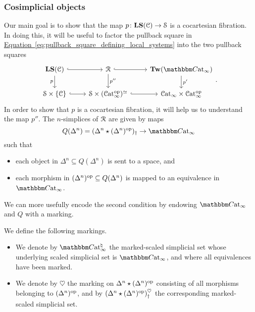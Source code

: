 \documentclass[main.tex]{subfiles}
\begin{document}
\subsubsection{Cosimplicial objects}
\label{sss:cosimplicial_objects}

Our main goal is to show that the map $p\colon \mathbf{LS}(\mathcal{C}) \to \mathcal{S}$ is a cocartesian fibration. In doing this, it will be useful to factor the pullback square in \hyperref[eq:pullback_square_defining_local_systems]{Equation~\ref*{eq:pullback_square_defining_local_systems}} into the two pullback squares
\begin{equation*}
  \begin{tikzcd}
    \LS(\category{C})
    \arrow[r, hook]
    \arrow[d, swap, "p"]
    & \mathcal{R}
    \arrow[r, hook]
    \arrow[d, "p''"]
    & \Tw(\ICCat)
    \arrow[d, "p'"]
    \\
    \S \times \{\category{C}\}
    \arrow[r, hook]
    & \S \times (\ICat\op)^{\simeq}
    \arrow[r, hook]
    & \ICat \times \ICat\op
  \end{tikzcd}.
\end{equation*}
In order to show that $p$ is a cocartesian fibration, it will help us to understand the map $p''$. The $n$-simplices of $\mathcal{R}$ are given by maps
\begin{equation*}
  Q(\Delta^{n}) = (\Delta^{n} \star (\Delta^{n})\op)_{\dagger} \to \ICCat
\end{equation*}
such that
\begin{itemize}
  \item each object in $\Delta^{n}\subseteq Q(\Delta^{n})$ is sent to a space, and

  \item each morphism in $(\Delta^{n})^{\mathrm{op}} \subseteq Q(\Delta^{n})$ is mapped to an equivalence in $\ICCat$.
\end{itemize}
We can more usefully encode the second condition by endowing $\ICCat$ and $Q$ with a marking.

\begin{definition}
  We define the following markings.
  \begin{itemize}
    \item We denote by $\ICCat^{\natural}$ the marked-scaled simplicial set whose underlying scaled simplicial set is $\ICCat$, and where all equivalences have been marked.

    \item We denote by $\heartsuit$ the marking on $\Delta^{n} \star (\Delta^{n})^{\mathrm{op}}$ consisting of all morphisms belonging to $(\Delta^{n})^{\mathrm{op}}$, and by $(\Delta^{n} \star (\Delta^{n})^{\mathrm{op}})^{\heartsuit}_{\dagger}$ the corresponding marked-scaled simplicial set.
  \end{itemize}
\end{definition}
\end{document}
